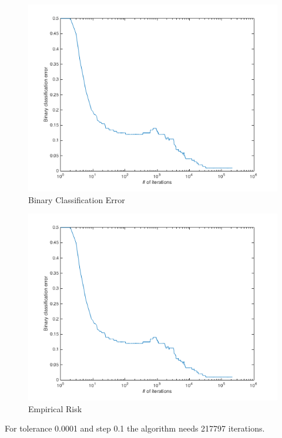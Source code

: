 \begin{figure}[!h]
{
    \includegraphics[width=\columnwidth]
    {figures/bin_err.png}
    \caption{\footnotesize{\bf}Binary Classification Error}
    \label{fig:bce}
}
\end{figure}

\begin{figure}[!h]
{
    \includegraphics[width=\columnwidth]
    {figures/bin_err.png}
    \caption{\footnotesize{\bf}Empirical Risk}
    \label{fig:er}
}
\end{figure}


For tolerance 0.0001 and step 0.1 the algorithm needs 217797 iterations.

